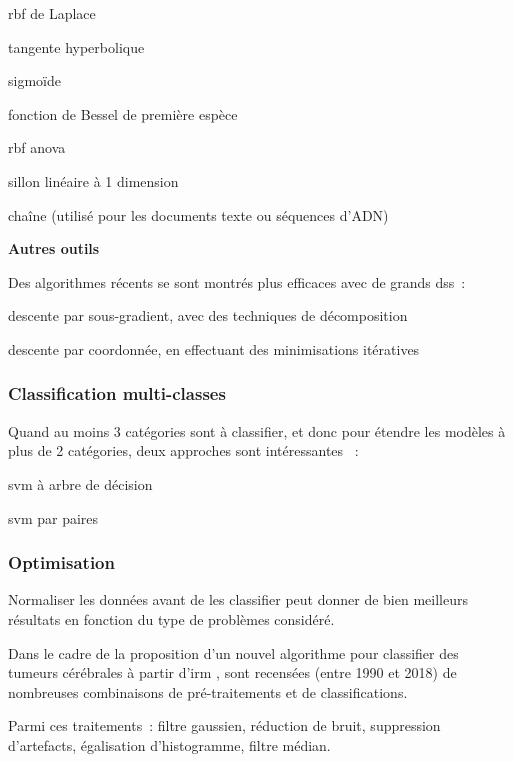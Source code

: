 \begin{itmz}
\item{\gls{rbf} de Laplace}
\item{tangente hyperbolique}
\item{sigmoïde}
\item{fonction de Bessel de première espèce}
\item{\gls{rbf} \gls{anova}}
\item{sillon linéaire à 1 dimension}
\item{chaîne (utilisé pour les documents texte ou séquences d’ADN)}
\end{itmz}

\textbf{Autres outils}

Des algorithmes récents se sont montrés plus efficaces avec de grands \glspl{ds} :

\begin{itmz}
\item{descente par sous-gradient, avec des techniques de décomposition}
\item{descente par coordonnée, en effectuant des minimisations itératives}
\end{itmz}

\subsubsection{Classification multi-classes}

Quand au moins 3 catégories sont à classifier,
et donc pour étendre les modèles à plus de 2 catégories,
deux approches sont intéressantes \cite{multi-class} :

\begin{itmz}
\item{\gls{svm} à arbre de décision}
\item{\gls{svm} par paires}
\end{itmz}

\subsubsection{Optimisation}

Normaliser les données avant de les classifier peut donner de bien meilleurs
résultats en fonction du type de problèmes considéré.

Dans le cadre de la proposition d’un nouvel algorithme pour classifier des
tumeurs cérébrales à partir d’\gls{irm} \cite{mri}, sont recensées
(entre 1990 et 2018) de nombreuses combinaisons de pré-traitements
et de classifications. \cite{optimization}

Parmi ces traitements : filtre gaussien, réduction de bruit,
suppression d’artefacts, égalisation d’histogramme, filtre médian.

\pagebreak
